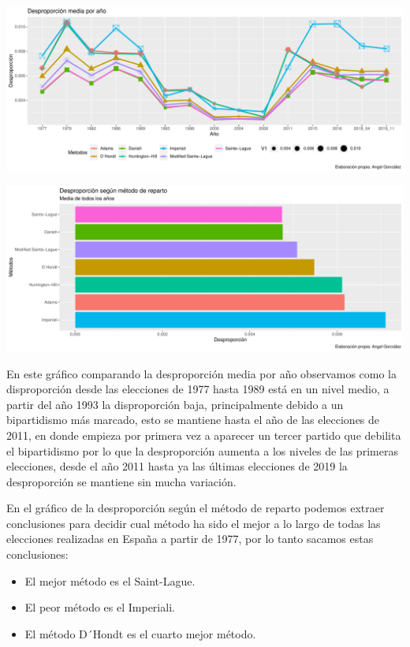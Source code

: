 \documentclass[12pt,a4paper,]{book}
\providecommand{\tightlist}{%
  \setlength{\itemsep}{0pt}\setlength{\parskip}{0pt}}
\numberwithin{dummy}{section}
\theoremstyle{ocrenumbox}
\theoremstyle{blacknumex}
\theoremstyle{blacknumbox}
\theoremstyle{ocrenum}
\theoremstyle{ocrenum}
\begin{document}
\begin{center}\includegraphics[width=0.95\linewidth]{figurasR/unnamed-chunk-187-1} \end{center}

\begin{center}\includegraphics[width=0.95\linewidth]{figurasR/unnamed-chunk-187-2} \end{center}

En este gráfico comparando la desproporción media por año observamos
como la disproporción desde las elecciones de 1977 hasta 1989 está en un
nivel medio, a partir del año 1993 la disproporción baja, principalmente
debido a un bipartidismo más marcado, esto se mantiene hasta el año de
las elecciones de 2011, en donde empieza por primera vez a aparecer un
tercer partido que debilita el bipartidismo por lo que la desproporción
aumenta a los niveles de las primeras elecciones, desde el año 2011
hasta ya las últimas elecciones de 2019 la desproporción se mantiene sin
mucha variación.

En el gráfico de la desproporción según el método de reparto podemos
extraer conclusiones para decidir cual método ha sido el mejor a lo
largo de todas las elecciones realizadas en España a partir de 1977, por
lo tanto sacamos estas conclusiones:

\begin{itemize}
\tightlist
\item
  El mejor método es el Saint-Lague.
\item
  El peor método es el Imperiali.
\item
  El método D´Hondt es el cuarto mejor método.
\end{itemize}
\end{document}
